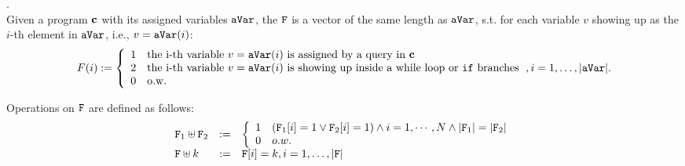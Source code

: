 \documentclass[a4paper,11pt]{article}
\begin{document}
\begin{defn}.
\\
Given a program  $\mathbf{{c}}$ with its assigned variables $\mathtt{aVar}$, the $\mathtt{F}$ is a vector of the same length as $\mathtt{aVar}$, s.t. for each variable $v$ showing up as the $i$-th element in $\mathtt{aVar}$, i.e., $v = \mathtt{aVar}(i)$:
%
%
\[
	F(i) := 
	\left\{
	\begin{array}{ll}
	1 & \text{the i-th variable $v = \avar(i)$ is assigned by a query in $\ssa{c}$}
	\\
	2 & \text{the i-th variable $v = \avar(i)$ is showing up inside a while loop or $\eif$ branches} 
	\\
	0 & \text{o.w.}
	\end{array}
	\right., 
	i = 1, \ldots, |\avar|.
\] 
\end{defn}
%
Operations on $\mathtt{F}$ are defined as follows:
\begin{equation}
\begin{array}{lll}
{\flag_1 \uplus \flag_2} & := &
\left\{
\begin{array}{ll}
1 & (\flag_1[i] = 1 \lor \flag_2[i] = 1) \land i = 1, \cdots, N \land |\flag_1| = |\flag_2|\\
0 & o.w.
\end{array}\right.
\\
{\flag \uplus k} & := & \flag[i] = k , i = 1, \ldots, |\flag|    \\
\end{array}
\end{equation}
\end{document}

